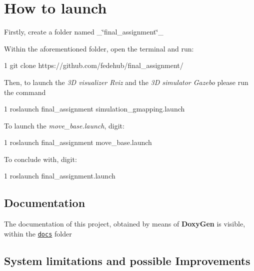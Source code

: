 \section*{How to launch}


\begin{DoxyEnumerate}
\item Firstly, create a folder named \+\_\+\char`\"{}final\+\_\+assignment\char`\"{}\+\_\+
\item Within the aforementioned folder, open the terminal and run\+:
\end{DoxyEnumerate}


\begin{DoxyCode}
1 git clone https://github.com/fedehub/final\_assignment/
\end{DoxyCode}

\begin{DoxyEnumerate}
\item Then, to launch the {\itshape 3D visualizer Rviz} and the {\itshape 3D simulator Gazebo} please run the command 
\begin{DoxyCode}
1 roslaunch final\_assignment simulation\_gmapping.launch
\end{DoxyCode}

\item To launch the {\itshape move\+\_\+base.\+launch}, digit\+:
\end{DoxyEnumerate}


\begin{DoxyCode}
1 roslaunch final\_assignment move\_base.launch
\end{DoxyCode}

\begin{DoxyEnumerate}
\item To conclude with, digit\+:
\end{DoxyEnumerate}


\begin{DoxyCode}
1 roslaunch final\_assignment.launch
\end{DoxyCode}


\subsection*{Documentation}

The documentation of this project, obtained by means of {\bfseries Doxy\+Gen} is visible, within the \href{https://github.com/fedehub/final_assignment/tree/main/docs}{\tt docs} folder

\subsection*{System limitation\textquotesingle{}s and possible Improvements}

